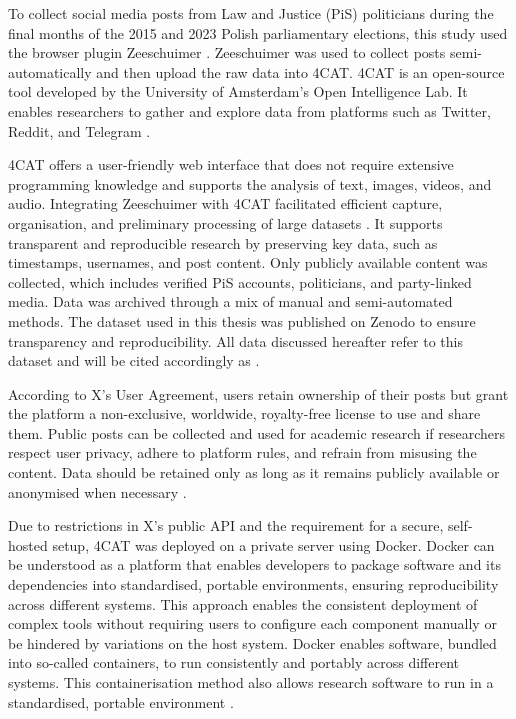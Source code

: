To collect social media posts from Law and Justice (PiS) politicians during the final months of the 2015 and 2023 Polish parliamentary elections, this study used the browser plugin Zeeschuimer \citep{stijn_peeters_zeeschuimer_2025}. Zeeschuimer was used to collect posts semi-automatically and then upload the raw data into 4CAT. 4CAT is an open-source tool developed by the University of Amsterdam's Open Intelligence Lab. It enables researchers to gather and explore data from platforms such as Twitter, Reddit, and Telegram \citep{peeters_4cat_2022}.

4CAT offers a user-friendly web interface that does not require extensive programming knowledge and supports the analysis of text, images, videos, and audio. Integrating Zeeschuimer with 4CAT facilitated efficient capture, organisation, and preliminary processing of large datasets \citep{stijn_peeters_zeeschuimer_2025}. It supports transparent and reproducible research by preserving key data, such as timestamps, usernames, and post content. Only publicly available content was collected, which includes verified PiS accounts, politicians, and party-linked media. Data was archived through a mix of manual and semi-automated methods. The dataset used in this thesis was published on Zenodo to ensure transparency and reproducibility. All data discussed hereafter refer to this dataset and will be cited accordingly as \citep{rybicki_2025_16933320}.

According to X's User Agreement, users retain ownership of their posts but grant the platform a non-exclusive, worldwide, royalty-free license to use and share them. Public posts can be collected and used for academic research if researchers respect user privacy, adhere to platform rules, and refrain from misusing the content. Data should be retained only as long as it remains publicly available or anonymised when necessary \citep{noauthor_twitter_2023}.

Due to restrictions in X's public API and the requirement for a secure, self-hosted setup, 4CAT was deployed on a private server using Docker. Docker can be understood as a platform that enables developers to package software and its dependencies into standardised, portable environments, ensuring reproducibility across different systems. This approach enables the consistent deployment of complex tools without requiring users to configure each component manually or be hindered by variations on the host system. Docker enables software, bundled into so-called containers, to run consistently and portably across different systems. This containerisation method also allows research software to run in a standardised, portable environment \citep{boettiger_2015}.

